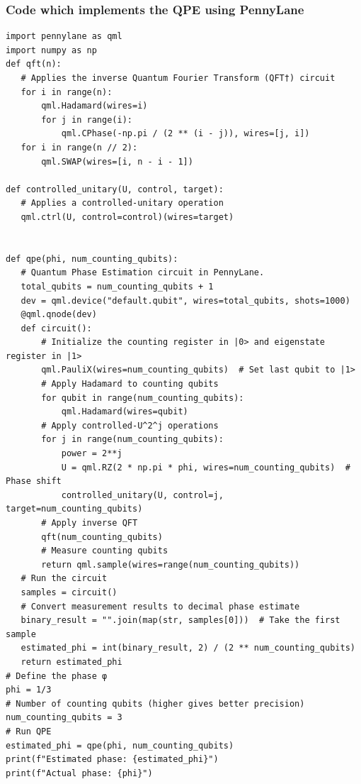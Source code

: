 \documentclass{beamer}
\begin{document}
\begin{frame}
\frametitle{Code which implements the QPE using PennyLane}

\begin{Verbatim}[numbers=none,fontsize=\fontsize{9pt}{9pt},baselinestretch=0.95]
import pennylane as qml
import numpy as np
def qft(n):
   # Applies the inverse Quantum Fourier Transform (QFT†) circuit
   for i in range(n):
       qml.Hadamard(wires=i)
       for j in range(i):
           qml.CPhase(-np.pi / (2 ** (i - j)), wires=[j, i])
   for i in range(n // 2):
       qml.SWAP(wires=[i, n - i - 1])

def controlled_unitary(U, control, target):
   # Applies a controlled-unitary operation
   qml.ctrl(U, control=control)(wires=target)


def qpe(phi, num_counting_qubits):
   # Quantum Phase Estimation circuit in PennyLane.
   total_qubits = num_counting_qubits + 1
   dev = qml.device("default.qubit", wires=total_qubits, shots=1000)
   @qml.qnode(dev)
   def circuit():
       # Initialize the counting register in |0> and eigenstate register in |1>
       qml.PauliX(wires=num_counting_qubits)  # Set last qubit to |1>
       # Apply Hadamard to counting qubits
       for qubit in range(num_counting_qubits):
           qml.Hadamard(wires=qubit)
       # Apply controlled-U^2^j operations
       for j in range(num_counting_qubits):
           power = 2**j
           U = qml.RZ(2 * np.pi * phi, wires=num_counting_qubits)  # Phase shift
           controlled_unitary(U, control=j, target=num_counting_qubits)
       # Apply inverse QFT
       qft(num_counting_qubits)
       # Measure counting qubits
       return qml.sample(wires=range(num_counting_qubits))
   # Run the circuit
   samples = circuit()
   # Convert measurement results to decimal phase estimate
   binary_result = "".join(map(str, samples[0]))  # Take the first sample
   estimated_phi = int(binary_result, 2) / (2 ** num_counting_qubits)
   return estimated_phi
# Define the phase φ
phi = 1/3
# Number of counting qubits (higher gives better precision)
num_counting_qubits = 3
# Run QPE
estimated_phi = qpe(phi, num_counting_qubits)
print(f"Estimated phase: {estimated_phi}")
print(f"Actual phase: {phi}")

\end{Verbatim}
\end{frame}
\end{document}
